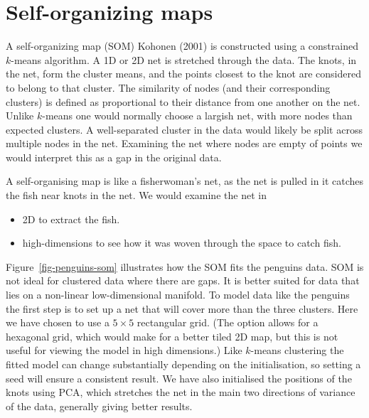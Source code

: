 \documentclass[
  letterpaper,
]{book}
\providecommand{\tightlist}{%
  \setlength{\itemsep}{0pt}\setlength{\parskip}{0pt}}\usepackage{longtable,booktabs,array}
\begin{document}
\hypertarget{sec-som}{%
\chapter{Self-organizing maps}\label{sec-som}}


A self-organizing map (SOM) Kohonen (2001) is constructed using a
constrained \(k\)-means algorithm. A 1D or 2D net is stretched through
the data. The knots, in the net, form the cluster means, and the points
closest to the knot are considered to belong to that cluster. The
similarity of nodes (and their corresponding clusters) is defined as
proportional to their distance from one another on the net. Unlike
\(k\)-means one would normally choose a largish net, with more nodes
than expected clusters. A well-separated cluster in the data would
likely be split across multiple nodes in the net. Examining the net
where nodes are empty of points we would interpret this as a gap in the
original data.

A self-organising map is like a fisherwoman's net, as the net is pulled
in it catches the fish near knots in the net. We would examine the net
in

\begin{itemize}
\tightlist
\item
  2D to extract the fish.
\item
  high-dimensions to see how it was woven through the space to catch
  fish.
\end{itemize}

Figure~\ref{fig-penguins-som} illustrates how the SOM fits the penguins
data. SOM is not ideal for clustered data where there are gaps. It is
better suited for data that lies on a non-linear low-dimensional
manifold. To model data like the penguins the first step is to set up a
net that will cover more than the three clusters. Here we have chosen to
use a \(5\times 5\) rectangular grid. (The option allows for a hexagonal
grid, which would make for a better tiled 2D map, but this is not useful
for viewing the model in high dimensions.) Like \(k\)-means clustering
the fitted model can change substantially depending on the
initialisation, so setting a seed will ensure a consistent result. We
have also initialised the positions of the knots using PCA, which
stretches the net in the main two directions of variance of the data,
generally giving better results.
\end{document}

